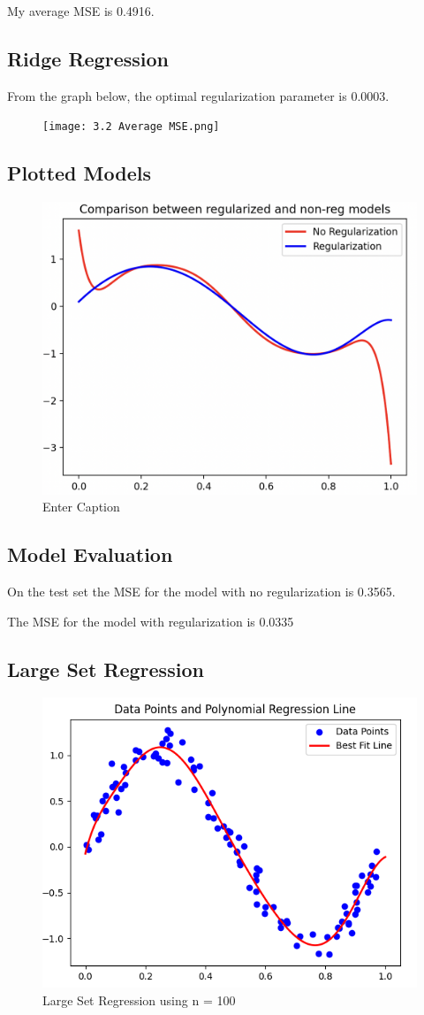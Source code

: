 \documentclass{article}
\begin{document}
My average MSE is 0.4916.

\subsection{Ridge Regression}
From the graph below, the optimal regularization parameter is 0.0003.
\begin{figure}[H]
    \centering
    \texttt{[image: 3.2 Average MSE.png]}
\end{figure}

\subsection{Plotted Models}
\begin{figure}[H]
    \centering
    \includegraphics[width=0.5\linewidth]{3.3 Models.png}
    \caption{Enter Caption}
    \label{fig:enter-label}
\end{figure}

\subsection{Model Evaluation}
On the test set the MSE for the model with no regularization is 0.3565.  

The MSE for the model with regularization is 0.0335

\subsection{Large Set Regression}

\begin{figure}[H]
    \centering
    \includegraphics[width=0.5\linewidth]{3.5 LargeSet Regression Graph.png}
    \caption{Large Set Regression using n = 100}
\end{figure}
\end{document}
